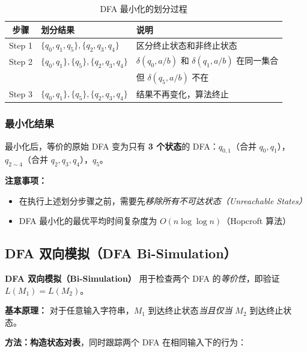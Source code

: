 \documentclass[12pt,a4paper]{ctexart}
\newcommand{\term}[1]{\textbf{\textcolor{mainblue}{#1}}}
\begin{document}
\vspace{0.5em}
\begin{table}[h]
\centering
\begin{tabular}{@{}c|l|l@{}}
\toprule
\textbf{步骤} & \textbf{划分结果} & \textbf{说明} \\
\midrule
Step 1 & $\{q_0, q_1, q_5\}, \{q_2, q_3, q_4\}$ & 区分终止状态和非终止状态 \\
Step 2 & $\{q_0, q_1\}, \{q_5\}, \{q_2, q_3, q_4\}$ &
  $\delta(q_0, a/b)$ 和 $\delta(q_1, a/b)$ 在同一集合\\
  & & 但 $\delta(q_5, a/b)$ 不在 \\
Step 3 & $\{q_0, q_1\}, \{q_5\}, \{q_2, q_3, q_4\}$ & 结果不再变化，算法终止 \\
\bottomrule
\end{tabular}
\caption{DFA 最小化的划分过程}
\end{table}

\subsubsection{最小化结果}

最小化后，等价的原始 DFA 变为只有 \textbf{3 个状态}的 DFA：$q_{0,1}$（合并 $q_0, q_1$），$q_{2\sim4}$（合并 $q_2, q_3, q_4$），$q_5$。

\begin{notebox}
  \textbf{注意事项：}
  \begin{itemize}
    \item 在执行上述划分步骤之前，需要先\emph{移除所有不可达状态（Unreachable States）}
    \item DFA 最小化的最优平均时间复杂度为 $O(n \log\log n)$（Hopcroft 算法）
  \end{itemize}
\end{notebox}

\subsection{DFA 双向模拟（DFA Bi-Simulation）}

\begin{keybox}
  \term{DFA 双向模拟（Bi-Simulation）} 用于检查两个 DFA 的\emph{等价性}，即验证 $L(M_1) = L(M_2)$。
\end{keybox}

\textbf{基本原理：} 对于任意输入字符串，$M_1$ 到达终止状态\emph{当且仅当} $M_2$ 到达终止状态。

\textbf{方法：构造状态对表}，同时跟踪两个 DFA 在相同输入下的行为：
\end{document}
